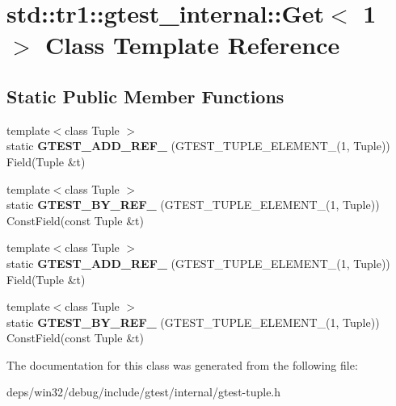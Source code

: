 \hypertarget{classstd_1_1tr1_1_1gtest__internal_1_1_get_3_011_01_4}{}\section{std\+:\+:tr1\+:\+:gtest\+\_\+internal\+:\+:Get$<$ 1 $>$ Class Template Reference}
\label{classstd_1_1tr1_1_1gtest__internal_1_1_get_3_011_01_4}
\subsection*{Static Public Member Functions}
\begin{DoxyCompactItemize}
\item 
\hypertarget{classstd_1_1tr1_1_1gtest__internal_1_1_get_3_011_01_4_a52b2f5d2bc283d76a3e8dede84dba154}{}{\footnotesize template$<$class Tuple $>$ }\\static {\bfseries G\+T\+E\+S\+T\+\_\+\+A\+D\+D\+\_\+\+R\+E\+F\+\_\+} (G\+T\+E\+S\+T\+\_\+\+T\+U\+P\+L\+E\+\_\+\+E\+L\+E\+M\+E\+N\+T\+\_\+(1, Tuple)) Field(Tuple \&t)\label{classstd_1_1tr1_1_1gtest__internal_1_1_get_3_011_01_4_a52b2f5d2bc283d76a3e8dede84dba154}

\item 
\hypertarget{classstd_1_1tr1_1_1gtest__internal_1_1_get_3_011_01_4_a481a2bf839c758408d46a1d0d41ff8f4}{}{\footnotesize template$<$class Tuple $>$ }\\static {\bfseries G\+T\+E\+S\+T\+\_\+\+B\+Y\+\_\+\+R\+E\+F\+\_\+} (G\+T\+E\+S\+T\+\_\+\+T\+U\+P\+L\+E\+\_\+\+E\+L\+E\+M\+E\+N\+T\+\_\+(1, Tuple)) Const\+Field(const Tuple \&t)\label{classstd_1_1tr1_1_1gtest__internal_1_1_get_3_011_01_4_a481a2bf839c758408d46a1d0d41ff8f4}

\item 
\hypertarget{classstd_1_1tr1_1_1gtest__internal_1_1_get_3_011_01_4_a52b2f5d2bc283d76a3e8dede84dba154}{}{\footnotesize template$<$class Tuple $>$ }\\static {\bfseries G\+T\+E\+S\+T\+\_\+\+A\+D\+D\+\_\+\+R\+E\+F\+\_\+} (G\+T\+E\+S\+T\+\_\+\+T\+U\+P\+L\+E\+\_\+\+E\+L\+E\+M\+E\+N\+T\+\_\+(1, Tuple)) Field(Tuple \&t)\label{classstd_1_1tr1_1_1gtest__internal_1_1_get_3_011_01_4_a52b2f5d2bc283d76a3e8dede84dba154}

\item 
\hypertarget{classstd_1_1tr1_1_1gtest__internal_1_1_get_3_011_01_4_a481a2bf839c758408d46a1d0d41ff8f4}{}{\footnotesize template$<$class Tuple $>$ }\\static {\bfseries G\+T\+E\+S\+T\+\_\+\+B\+Y\+\_\+\+R\+E\+F\+\_\+} (G\+T\+E\+S\+T\+\_\+\+T\+U\+P\+L\+E\+\_\+\+E\+L\+E\+M\+E\+N\+T\+\_\+(1, Tuple)) Const\+Field(const Tuple \&t)\label{classstd_1_1tr1_1_1gtest__internal_1_1_get_3_011_01_4_a481a2bf839c758408d46a1d0d41ff8f4}

\end{DoxyCompactItemize}


The documentation for this class was generated from the following file\+:\begin{DoxyCompactItemize}
\item 
deps/win32/debug/include/gtest/internal/gtest-\/tuple.\+h\end{DoxyCompactItemize}
